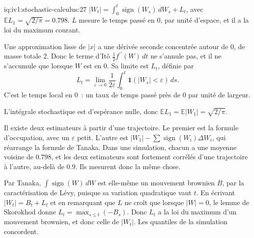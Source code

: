 \begin{solution}{iq:iv1:stochastic-calculus:27}
$|W_t| = \int_0^t\operatorname{sign}(W_s)\,dW_s + L_t$, avec $\mathbb{E}L_1 = \sqrt{2/\pi} = 0.798$. $L$ mesure le temps passé en 0, par unité d'espace, et il a la loi du maximum courant.

Une approximation lisse de $|x|$ a une dérivée seconde concentrée autour de 0, de masse totale 2. Donc le terme d'Itô $\frac12f^{\prime\prime}(W)\,dt$ ne s'annule pas, et il ne s'accumule que lorsque $W$ est en 0. Sa limite est $L_t$, définie par
\[
L_t = \lim_{\varepsilon \to 0}\frac{1}{2\varepsilon}\int_0^t\mathbf{1}(|W_s| < \varepsilon)\,ds.
\]
C'est le temps local en 0~: un taux de temps passé près de 0 par unité de largeur.

L'intégrale stochastique est d'espérance nulle, donc $\mathbb{E}L_1 = \mathbb{E}|W_1| = \sqrt{2/\pi}$.

Il existe deux estimateurs à partir d'une trajectoire. Le premier est la formule d'occupation, avec un $\varepsilon$ petit. L'autre est $|W_1| - \sum\operatorname{sign}(W_{i})\Delta W_i$, qui réarrange la formule de Tanaka. Dans une simulation, chacun a une moyenne voisine de $0.798$, et les deux estimateurs sont fortement corrélés d'une trajectoire à l'autre, au-delà de $0.9$. Ils mesurent donc la même chose.

Par Tanaka, $\int\operatorname{sign}(W)\,dW$ est elle-même un mouvement brownien $B$, par la caractérisation de Lévy, puisque sa variation quadratique vaut $t$. En écrivant $|W_t| = B_t + L_t$ et en remarquant que $L$ ne croît que lorsque $|W| = 0$, le lemme de Skorokhod donne $L_t = \max_{s \le t}(-B_s)$. Donc $L_t$ a la loi du maximum d'un mouvement brownien, et donc celle de $|W_t|$. Les quantiles de la simulation concordent.



\end{solution}

